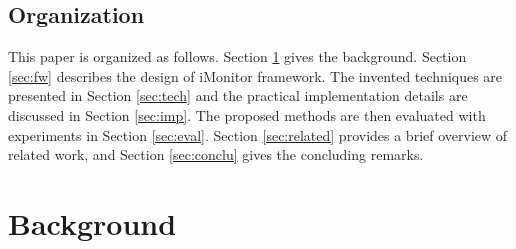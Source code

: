 \documentclass[preprint]{sigplanconf}
\begin{document}
\subsection{Organization}
This paper is organized as follows. Section \ref{sec:bg} gives the
background. Section \ref{sec:fw} describes the design of iMonitor
framework. The invented techniques are presented in Section \ref{sec:tech}
and the practical implementation details are discussed in Section 
\ref{sec:imp}. The proposed methods are then evaluated with experiments in 
Section \ref{sec:eval}. Section \ref{sec:related} provides a brief overview of
related work, and Section \ref{sec:conclu} gives the concluding remarks.

\section{Background} \label{sec:bg}
\end{document}
